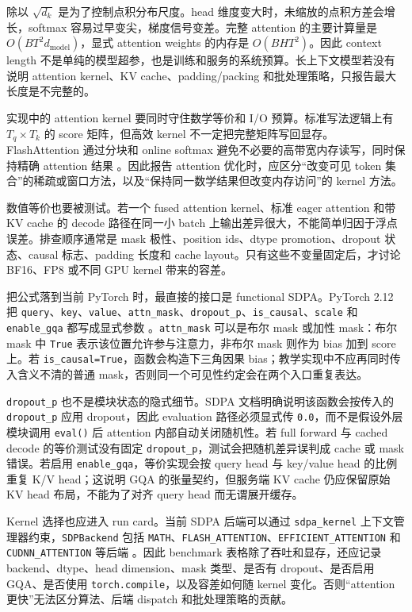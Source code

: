 \documentclass[UTF8,zihao=-4,openany]{ctexbook}
\begin{document}
除以 $\sqrt{d_k}$ 是为了控制点积分布尺度。head 维度变大时，未缩放的点积方差会增长，softmax 容易过早变尖，梯度信号变差。完整 attention 的主要计算量是 $O(BT^2d_{\mathrm{model}})$，显式 attention weights 的内存是 $O(BHT^2)$。因此 context length 不是单纯的模型超参，也是训练和服务的系统预算。长上下文模型若没有说明 attention kernel、KV cache、padding/packing 和批处理策略，只报告最大长度是不完整的。

实现中的 attention kernel 要同时守住数学等价和 I/O 预算。标准写法逻辑上有 $T_q\times T_k$ 的 score 矩阵，但高效 kernel 不一定把完整矩阵写回显存。FlashAttention 通过分块和 online softmax 避免不必要的高带宽内存读写，同时保持精确 attention 结果 \cite{dao2022flashattention}。因此报告 attention 优化时，应区分“改变可见 token 集合”的稀疏或窗口方法，以及“保持同一数学结果但改变内存访问”的 kernel 方法。

数值等价也要被测试。若一个 fused attention kernel、标准 eager attention 和带 KV cache 的 decode 路径在同一小 batch 上输出差异很大，不能简单归因于浮点误差。排查顺序通常是 mask 极性、position ids、dtype promotion、dropout 状态、causal 标志、padding 长度和 cache layout。只有这些不变量固定后，才讨论 BF16、FP8 或不同 GPU kernel 带来的容差。

把公式落到当前 PyTorch 时，最直接的接口是 functional SDPA。PyTorch 2.12 把 \texttt{query}、\texttt{key}、\texttt{value}、\texttt{attn\_mask}、\texttt{dropout\_p}、\texttt{is\_causal}、\texttt{scale} 和 \texttt{enable\_gqa} 都写成显式参数 \cite{pytorch2026sdpa}。\texttt{attn\_mask} 可以是布尔 mask 或加性 mask：布尔 mask 中 \texttt{True} 表示该位置允许参与注意力，非布尔 mask 则作为 bias 加到 score 上。若 \texttt{is\_causal=True}，函数会构造下三角因果 bias；教学实现中不应再同时传入含义不清的普通 mask，否则同一个可见性约定会在两个入口重复表达。

\texttt{dropout\_p} 也不是模块状态的隐式细节。SDPA 文档明确说明该函数会按传入的 \texttt{dropout\_p} 应用 dropout，因此 evaluation 路径必须显式传 \texttt{0.0}，而不是假设外层模块调用 \texttt{eval()} 后 attention 内部自动关闭随机性。若 full forward 与 cached decode 的等价测试没有固定 \texttt{dropout\_p}，测试会把随机差异误判成 cache 或 mask 错误。若启用 \texttt{enable\_gqa}，等价实现会按 query head 与 key/value head 的比例重复 K/V head；这说明 GQA 的张量契约，但服务端 KV cache 仍应保留原始 KV head 布局，不能为了对齐 query head 而无谓展开缓存。

Kernel 选择也应进入 run card。当前 SDPA 后端可以通过 \texttt{sdpa\_kernel} 上下文管理器约束，\texttt{SDPBackend} 包括 \texttt{MATH}、\texttt{FLASH\_ATTENTION}、\texttt{EFFICIENT\_ATTENTION} 和 \texttt{CUDNN\_ATTENTION} 等后端 \cite{pytorch2026sdpakernel}。因此 benchmark 表格除了吞吐和显存，还应记录 backend、dtype、head dimension、mask 类型、是否有 dropout、是否启用 GQA、是否使用 \texttt{torch.compile}，以及容差如何随 kernel 变化。否则“attention 更快”无法区分算法、后端 dispatch 和批处理策略的贡献。
\end{document}
